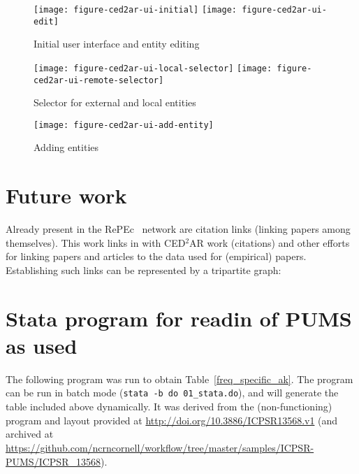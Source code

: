 \documentclass[x11names]{article}
\newcommand{\repec}{RePEc}
\begin{document}
\begin{figure}
\caption{Initial user interface and entity editing}\label{fig:ui:initial}
\centering
\texttt{[image: figure-ced2ar-ui-initial]}
\label{fig:ui:edit}
\centering
\texttt{[image: figure-ced2ar-ui-edit]}
\end{figure}



\begin{figure}
\caption{Selector for external and local entities}\label{fig:ui:data-selector:doi}
\label{fig:ui:data-selector:local}
\texttt{[image: figure-ced2ar-ui-local-selector]}
\texttt{[image: figure-ced2ar-ui-remote-selector]}

\end{figure}

\begin{figure}
\caption{Adding entities}\label{fig:ui:add-entity}
\centering
\texttt{[image: figure-ced2ar-ui-add-entity]}
\end{figure}


\clearpage

\section{Future work}
\label{sec:future_work}
Already present in the \repec~ network are citation links (linking papers among themselves). This work links in with CED$^2$AR work (citations) and other efforts for linking papers and articles to the data used for (empirical) papers. Establishing such links can be represented by a tripartite graph:

\printbibliography

\appendix

\section{Stata program for readin of PUMS as used}
\label{sec:stata1}
The following program was run to obtain Table~\ref{freq_specific_ak}. The program can be run 
in batch mode (\texttt{stata -b do 01\_stata.do}), and will generate the table included above 
dynamically. It was derived from the (non-functioning) program and layout provided at 
\url{http://doi.org/10.3886/ICPSR13568.v1} (and archived at 
\url{https://github.com/ncrncornell/workflow/tree/master/samples/ICPSR-PUMS/ICPSR_13568}).
\end{document}
